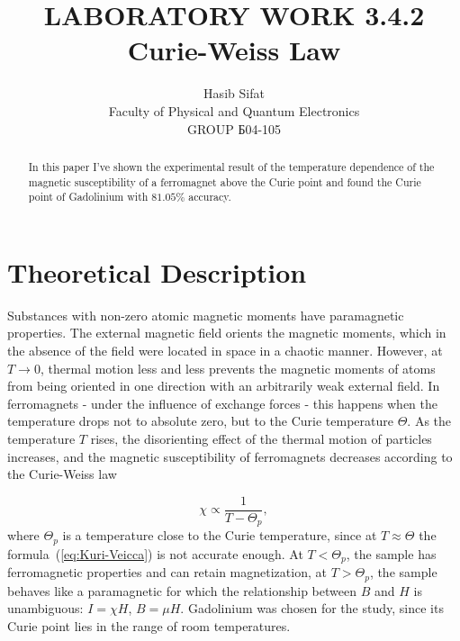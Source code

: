 \documentclass[a4paper, 12pt]{article}%
\author{Hasib Sifat \\
Faculty of Physical and Quantum Electronics \\
GROUP Б04-105}
\title{\textbf{LABORATORY WORK 3.4.2 \\ 
Curie-Weiss Law}}
\begin{document}
\maketitle

\begin{abstract}
In this paper I've shown the experimental result of the temperature dependence of the magnetic susceptibility of a ferromagnet above the Curie point and found the Curie point of Gadolinium with $81.05\%$ accuracy.
\end{abstract}
\section{Theoretical Description} Substances with non-zero atomic magnetic moments have paramagnetic properties. The external magnetic field orients the magnetic moments, which in the absence of the field were located in space in a chaotic manner. However, at $T\rightarrow 0$, thermal motion less and less prevents the magnetic moments of atoms from being oriented in one direction with an arbitrarily weak external field. In ferromagnets - under the influence of exchange forces - this happens when the temperature drops not to absolute zero, but to the Curie temperature $\Theta$. As the temperature $T$ rises, the disorienting effect of the thermal motion of particles increases, and the magnetic susceptibility of ferromagnets decreases according to the Curie-Weiss law


\begin{equation}
		\label{eq:Kuri-Veicca}
		\chi \propto \frac{1}{T-\Theta_p},
	\end{equation}
where $\Theta_p$ is a temperature close to the Curie temperature, since at $T\approx\Theta$ the formula~(\ref{eq:Kuri-Veicca}) is not accurate enough. At $T < \Theta_p$, the sample has ferromagnetic properties and can retain magnetization, at $T > \Theta_p$, the sample behaves like a paramagnetic for which the relationship between $B$ and $H$ is unambiguous: $I = \chi H$, $B = \mu H$. Gadolinium was chosen for the study, since its Curie point lies in the range of room temperatures.
\end{document}

